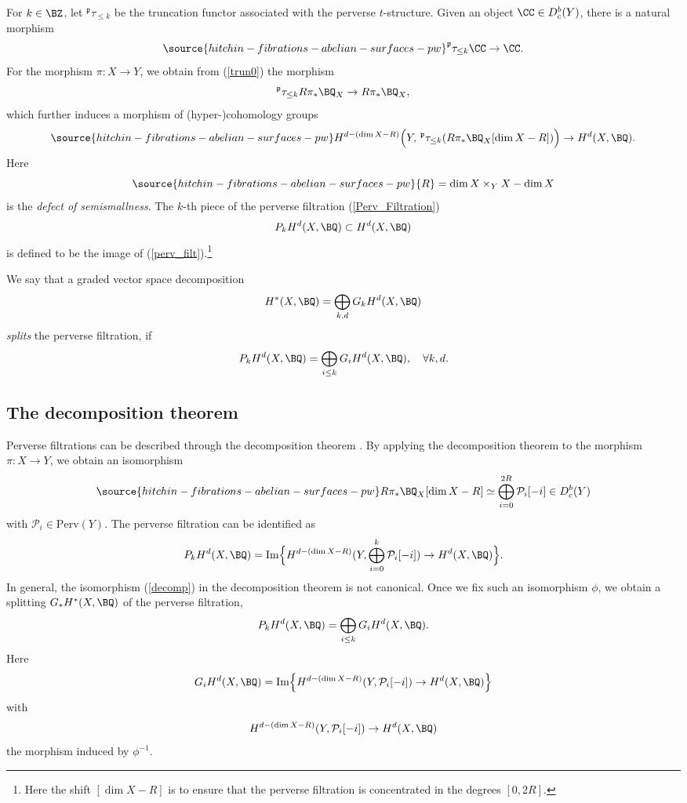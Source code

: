 For $k \in \BZ$, let $^\mathfrak{p}\tau_{\leq k}$ be the truncation functor associated with the perverse $t$-structure. Given an object $\CC \in D_c^b(Y)$, there is a natural morphism
\begin{equation}\label{trun0}
\source{hitchin-fibrations-abelian-surfaces-pw}
^\mathfrak{p}\tau_{\le k}\CC \rightarrow \CC.
\end{equation}
For the morphism $\pi:X \to Y$, we obtain from (\ref{trun0}) the morphism
\[
^\mathfrak{p}\tau_{\le k}R\pi_\ast \BQ_X \rightarrow R\pi_\ast \BQ_X,
\]
which further induces a morphism of (hyper-)cohomology groups
\begin{equation}\label{perv_filt}
\source{hitchin-fibrations-abelian-surfaces-pw}
H^{d-(\dim X -{ R})}\Big{(}Y, \, ^\mathfrak{p}\tau_{\le k}(R\pi_\ast \BQ_X[\dim X - { R}]) \Big{)} \rightarrow H^d(X, \BQ).
\end{equation}
Here
\begin{equation}\label{defect}
\source{hitchin-fibrations-abelian-surfaces-pw}
    {R} = \dim X \times_Y X - \dim X
\end{equation}
is the \emph{defect of semismallness}. The $k$-th piece of the perverse filtration (\ref{Perv_Filtration})
\[
P_kH^d(X, \BQ) \subset H^d(X, \BQ)
\]
is defined to be the image of (\ref{perv_filt}).\footnote{Here the shift $[\dim X- {R}]$ is to ensure that the perverse filtration is concentrated in the degrees $[0, 2 { R}]$.}

We say that a  graded vector space decomposition
\[
H^*(X, \BQ) = \bigoplus_{k,d} G_k H^d(X, \BQ)
\]
\emph{splits} the perverse filtration, if
\[
P_k H^d(X, \BQ) = \bigoplus_{i \leq k} G_i H^d(X, \BQ), \quad \forall k,d.
\]


\subsection{The decomposition theorem}\label{sec1.3}
Perverse filtrations can be described through the decomposition theorem \cite{BBD,dCM0}. By applying the decomposition theorem to the morphism $\pi: X \to Y$, we obtain an isomorphism
\begin{equation}\label{decomp}
\source{hitchin-fibrations-abelian-surfaces-pw}
R\pi_*\BQ_X[\dim X- { R}]\simeq \bigoplus_{i=0}^{2{ R}}\mathcal{P}_i[-i] \in D^b_c(Y)
\end{equation}
with $\mathcal{P}_i  \in \mathrm{Perv}(Y)$. The perverse filtration can be identified as
\[
P_kH^d(X,\BQ)=\mathrm{Im}\Big\{H^{d-(\dim X - { R})}(Y, \bigoplus_{i=0}^k\mathcal{P}_i[-i])\to H^d(X,\BQ)\Big\}.
\]
In general, the isomorphism (\ref{decomp}) in the decomposition theorem is not canonical. Once we fix such an isomorphism $\phi$, we obtain a splitting $G_\ast H^\ast(X, \BQ)$ of the perverse filtration,
\[
P_kH^d(X, \BQ) = \bigoplus_{i\leq k} G_iH^d(X, \BQ).
\]
Here
\[
G_iH^d(X, \BQ) = \mathrm{Im}\Big\{ H^{d-(\dim X - { R})}(Y, \mathcal{P}_i[-i])\to H^d(X,\BQ)\Big\}
\]
with
\[
H^{d-(\dim X - {R})}(Y, \mathcal{P}_i[-i])\to H^d(X,\BQ)
\]
the morphism induced by $\phi^{-1}$.

